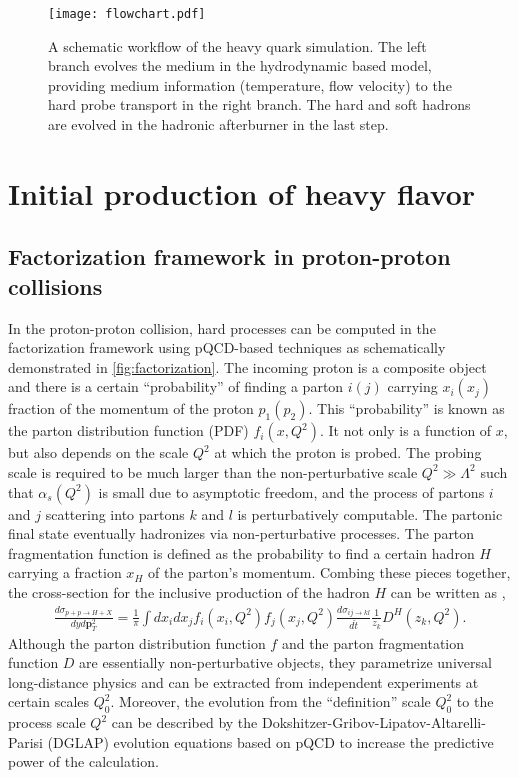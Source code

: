\begin{figure}
\singlespacing
\centering
\texttt{[image: flowchart.pdf]}
\caption[A schematic workflow of the heavy quark simulation. The left]{A schematic workflow of the heavy quark simulation. The left branch evolves the medium in the hydrodynamic based model, providing medium information (temperature, flow velocity) to the hard probe transport in the right branch. The hard and soft hadrons are evolved in the hadronic afterburner in the last step.}
\label{fig:flowchart}
\end{figure}

\section{Initial production of heavy flavor}
\label{section:hard}
\subsection{Factorization framework in proton-proton collisions}
In the proton-proton collision, hard processes can be computed in the factorization framework using pQCD-based techniques as schematically demonstrated in \ref{fig:factorization}.
The incoming proton is a composite object and there is a certain ``probability'' of finding a parton $i(j)$ carrying $x_i(x_j)$ fraction of the momentum of the proton $p_1(p_2)$.
This ``probability'' is known as the parton distribution function (PDF) $f_i(x, Q^2)$.
It not only is a function of $x$, but also depends on the scale $Q^2$ at which the proton is probed.
The probing scale is required to be much larger than the non-perturbative scale $Q^2 \gg \Lambda^2$ such that $\alpha_s(Q^2)$ is small due to asymptotic freedom, and the process of partons $i$ and $j$ scattering into partons $k$ and $l$ is perturbatively computable.
The partonic final state eventually hadronizes via non-perturbative processes.
The parton fragmentation function is defined as the probability to find a certain hadron $H$ carrying a fraction $x_H$ of the parton's momentum.
Combing these pieces together, the cross-section for the inclusive production of the hadron $H$ can be written as \cite{Field:1989uq},
\begin{eqnarray}
\frac{d\sigma_{p+p\rightarrow H+X}}{dy d\mathbf{p}_T^2} = \frac{1}{\pi}\int dx_i dx_j f_i(x_i, Q^2) f_j(x_j, Q^2) \frac{d\sigma_{ij\rightarrow kl}}{d\hat{t}} \frac{1}{z_k}D^H(z_k, Q^2).
\end{eqnarray}
Although the parton distribution function $f$ and the parton fragmentation function $D$ are essentially non-perturbative objects, they parametrize universal long-distance physics and can be extracted from independent experiments at certain scales $Q_0^2$.
Moreover, the evolution from the ``definition'' scale $Q_0^2$ to the process scale $Q^2$ can be described by the Dokshitzer-Gribov-Lipatov-Altarelli-Parisi (DGLAP) evolution equations \cite{Gribov:1972ri,Altarelli:1977zs,Dokshitzer:1977sg} based on pQCD to increase the predictive power of the calculation.

